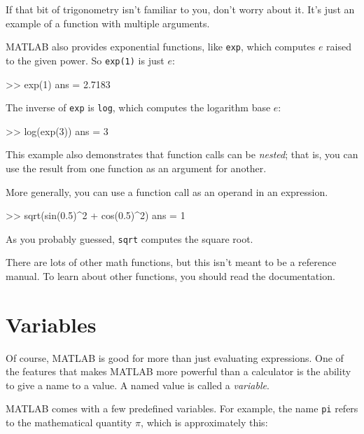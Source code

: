 \documentclass[../../book.tex]{subfiles}
\begin{document}
If that bit of trigonometry isn't familiar to you, don't worry about
it.  It's just an example of a function with multiple arguments.


MATLAB also provides exponential functions, like \lstinline{exp}, which computes $e$ raised to the given power.  So \lstinline{exp(1)} is just $e$:

\begin{code}
>> exp(1)
ans = 2.7183
\end{code}


The inverse of \lstinline{exp} is \lstinline{log}, which computes the logarithm base $e$:

\begin{code}
>> log(exp(3))
ans = 3
\end{code}

This example also demonstrates that function calls can be \emph{nested};
that is, you can use the result from one function as an argument for
another.


More generally, you can use a function call as an operand in an \mbox{expression}.

\begin{code}
>> sqrt(sin(0.5)^2 + cos(0.5)^2)
ans = 1
\end{code}

As you probably guessed, \lstinline{sqrt} computes the square root.


There are lots of other math functions, but this isn't meant to
be a reference manual.  To learn about other functions, you should
read the documentation.


\section{Variables}

Of course, MATLAB is good for more than just evaluating expressions. One of the features that makes MATLAB more powerful than a calculator is the ability to give a name to a value.  A named value is called a \emph{variable}.


MATLAB comes with a few predefined variables. For
example, the name \lstinline{pi} refers to the
mathematical quantity $\pi$, which is approximately this:
\end{document}
